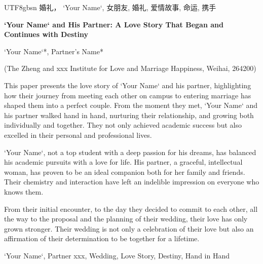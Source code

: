 \documentclass[a4paper]{article}
\begin{document}
\begin{CJK}{UTF8}{gbsn}
\vspace{2em}
 婚礼， `Your Name`, 女朋友, 婚礼, 爱情故事, 命运, 携手
\vspace{2em}

\begin{center}
{\Large\bf `Your Name` and His Partner: A Love Story That Began and Continues with Destiny}
\end{center}

\begin{center}
`Your Name`*, Partner's Name*
\end{center}

\begin{center}
\small (The Zheng and xxx Institute for Love and Marriage Happiness, Weihai, 264200)
\end{center}

 This paper presents the love story of `Your Name` and his partner, highlighting how their journey from meeting each other on campus to entering marriage has shaped them into a perfect couple. From the moment they met, `Your Name` and his partner walked hand in hand, nurturing their relationship, and growing both individually and together. They not only achieved academic success but also excelled in their personal and professional lives.

`Your Name`, not a top student with a deep passion for his dreams, has balanced his academic pursuits with a love for life. His partner, a graceful, intellectual woman, has proven to be an ideal companion both for her family and friends. Their chemistry and interaction have left an indelible impression on everyone who knows them.

From their initial encounter, to the day they decided to commit to each other, all the way to the proposal and the planning of their wedding, their love has only grown stronger. Their wedding is not only a celebration of their love but also an affirmation of their determination to be together for a lifetime.

\vspace{2em}

 `Your Name`, Partner xxx, Wedding, Love Story, Destiny, Hand in Hand

\end{CJK}
\end{document}
